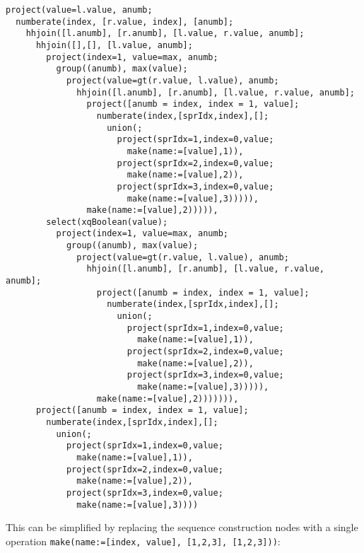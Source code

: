 \begin{Verbatim}
project(value=l.value, anumb;
  numberate(index, [r.value, index], [anumb];
    hhjoin([l.anumb], [r.anumb], [l.value, r.value, anumb];
      hhjoin([],[], [l.value, anumb];
        project(index=1, value=max, anumb;
          group((anumb), max(value);
            project(value=gt(r.value, l.value), anumb;
              hhjoin([l.anumb], [r.anumb], [l.value, r.value, anumb];
                project([anumb = index, index = 1, value];
                  numberate(index,[sprIdx,index],[];
                    union(;
                      project(sprIdx=1,index=0,value;
                        make(name:=[value],1)),
                      project(sprIdx=2,index=0,value;
                        make(name:=[value],2)),
                      project(sprIdx=3,index=0,value;
                        make(name:=[value],3))))),
                make(name:=[value],2))))),
        select(xqBoolean(value);
          project(index=1, value=max, anumb;
            group((anumb), max(value);
              project(value=gt(r.value, l.value), anumb;
                hhjoin([l.anumb], [r.anumb], [l.value, r.value, anumb];
                  project([anumb = index, index = 1, value];
                    numberate(index,[sprIdx,index],[];
                      union(;
                        project(sprIdx=1,index=0,value;
                          make(name:=[value],1)),
                        project(sprIdx=2,index=0,value;
                          make(name:=[value],2)),
                        project(sprIdx=3,index=0,value;
                          make(name:=[value],3))))),
                  make(name:=[value],2))))))),
      project([anumb = index, index = 1, value];
        numberate(index,[sprIdx,index],[];
          union(;
            project(sprIdx=1,index=0,value;
              make(name:=[value],1)),
            project(sprIdx=2,index=0,value;
              make(name:=[value],2)),
            project(sprIdx=3,index=0,value;
              make(name:=[value],3))))
\end{Verbatim}
 
This can be simplified by replacing the sequence construction nodes with a
single operation \texttt{make(name:=[index, value], [1,2,3], [1,2,3]))}:

